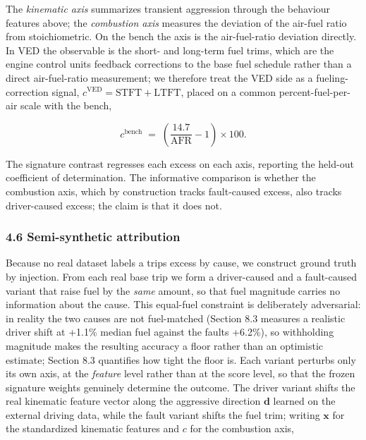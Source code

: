 The \emph{kinematic axis} summarizes transient aggression through the
behaviour features above; the \emph{combustion axis} measures the
deviation of the air-fuel ratio from stoichiometric. On the bench the
axis is the air-fuel-ratio deviation directly. In VED the observable is
the short- and long-term fuel trims, which are the engine control
unit\textquotesingle s feedback corrections to the base fuel schedule
rather than a direct air-fuel-ratio measurement; we therefore treat the
VED side as a fueling-correction signal,
\(c^{\text{VED}} = \text{STFT}+\text{LTFT}\), placed on a common
percent-fuel-per-air scale with the bench,

\begin{equation} c^{\text{bench}} \;=\; \left(\frac{14.7}{\text{AFR}}-1\right)\times 100 . \end{equation}

The signature contrast regresses each excess on each axis, reporting the
held-out coefficient of determination. The informative comparison is
whether the combustion axis, which by construction tracks fault-caused
excess, also tracks driver-caused excess; the claim is that it does not.

\subsubsection{4.6 Semi-synthetic
attribution}\label{semi-synthetic-attribution}

Because no real dataset labels a trip\textquotesingle s excess by cause,
we construct ground truth by injection. From each real base trip we form
a driver-caused and a fault-caused variant that raise fuel by the
\emph{same} amount, so that fuel magnitude carries no information about
the cause. This equal-fuel constraint is deliberately adversarial: in
reality the two causes are not fuel-matched (Section 8.3 measures a
realistic driver shift at +1.1\% median fuel against the
fault\textquotesingle s +6.2\%), so withholding magnitude makes the
resulting accuracy a floor rather than an optimistic estimate; Section
8.3 quantifies how tight the floor is. Each variant perturbs only its
own axis, at the \emph{feature} level rather than at the score level, so
that the frozen signature weights genuinely determine the outcome. The
driver variant shifts the real kinematic feature vector along the
aggressive direction \(\mathbf{d}\) learned on the external driving
data, while the fault variant shifts the fuel trim; writing
\(\mathbf{x}\) for the standardized kinematic features and \(c\) for the
combustion axis,

